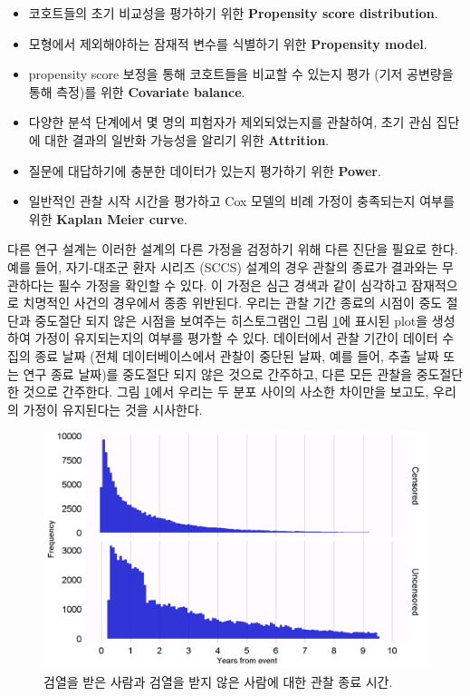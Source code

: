 \documentclass[11pt]{book}
\providecommand{\tightlist}{%
  \setlength{\itemsep}{0pt}\setlength{\parskip}{0pt}}
\theoremstyle{definition}
\theoremstyle{definition}
\theoremstyle{definition}
\theoremstyle{remark}
\begin{document}
\begin{itemize}
\tightlist
\item
  코호트들의 초기 비교성을 평가하기 위한 \textbf{Propensity score
  distribution}.
\item
  모형에서 제외해야하는 잠재적 변수를 식별하기 위한 \textbf{Propensity
  model}.
\item
  propensity score 보정을 통해 코호트들을 비교할 수 있는지 평가 (기저
  공변량을 통해 측정)를 위한 \textbf{Covariate balance}.
\item
  다양한 분석 단계에서 몇 명의 피험자가 제외되었는지를 관찰하여, 초기
  관심 집단에 대한 결과의 일반화 가능성을 알리기 위한
  \textbf{Attrition}.
\item
  질문에 대답하기에 충분한 데이터가 있는지 평가하기 위한 \textbf{Power}.
\item
  일반적인 관찰 시작 시간을 평가하고 Cox 모델의 비례 가정이 충족되는지
  여부를 위한 \textbf{Kaplan Meier curve}.
\end{itemize}

다른 연구 설계는 이러한 설계의 다른 가정을 검정하기 위해 다른 진단을
필요로 한다. 예를 들어, 자기-대조군 환자 시리즈 (SCCS) 설계의 경우
관찰의 종료가 결과와는 무관하다는 필수 가정을 확인할 수 있다. 이 가정은
심근 경색과 같이 심각하고 잠재적으로 치명적인 사건의 경우에서 종종
위반된다. 우리는 관찰 기간 종료의 시점이 중도 절단과 중도절단 되지 않은
시점을 보여주는 히스토그램인 그림 \ref{fig:timeToObsEnd}에 표시된 plot을
생성하여 가정이 유지되는지의 여부를 평가할 수 있다. 데이터에서 관찰
기간이 데이터 수집의 종료 날짜 (전체 데이터베이스에서 관찰이 중단된
날짜, 예를 들어, 추출 날짜 또는 연구 종료 날짜)를 중도절단 되지 않은
것으로 간주하고, 다른 모든 관찰을 중도절단한 것으로 간주한다. 그림
\ref{fig:timeToObsEnd}에서 우리는 두 분포 사이의 사소한 차이만을 보고도,
우리의 가정이 유지된다는 것을 시사한다.

\begin{figure}

{\centering \includegraphics[width=1\linewidth]{images/MethodValidity/timeToObsEnd} 

}

\caption{검열을 받은 사람과 검열을 받지 않은 사람에 대한 관찰 종료 시간.}\label{fig:timeToObsEnd}
\end{figure}
\end{document}
